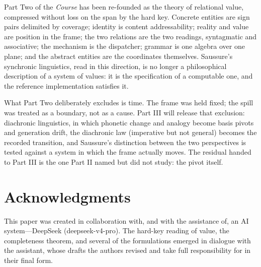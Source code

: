 \documentclass[11pt,a4paper]{article}
\theoremstyle{remark}
\begin{document}
Part Two of the \textit{Course} has been re-founded as the theory of
relational value, compressed without loss on the span by the hard key.
Concrete entities are sign pairs delimited by coverage; identity is
content addressability; reality and value are position in the frame; the two
relations are the two readings, syntagmatic and associative; the mechanism is
the dispatcher; grammar is one algebra over one plane; and the abstract
entities are the coordinates themselves. Saussure's synchronic linguistics,
read in this direction, is no longer a philosophical description of a system
of values: it is the specification of a computable one, and the reference
implementation satisfies it.

What Part Two deliberately excludes is time. The frame was held fixed; the
spill was treated as a boundary, not as a cause. Part III will release that
exclusion: diachronic linguistics, in which phonetic change and analogy become
basis pivots and generation drift, the diachronic law (imperative but not
general) becomes the recorded transition, and Saussure's distinction between
the two perspectives is tested against a system in which the frame actually
moves. The residual handed to Part III is the one Part II named but did not
study: the pivot itself.

\section*{Acknowledgments}
This paper was created in collaboration with, and with the assistance of, an
AI system---DeepSeek (deepseek-v4-pro). The hard-key reading of value, the
completeness theorem, and several of the formulations emerged in dialogue
with the assistant, whose drafts the authors revised and take full
responsibility for in their final form.
\end{document}
